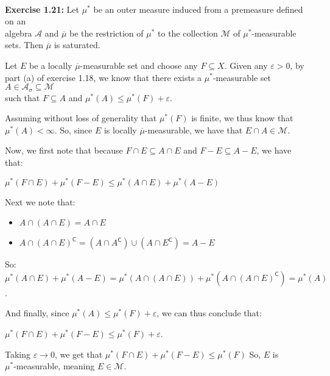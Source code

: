 \documentclass{book}
\newcommand{\exTwoP}{%
   \color{RedViolet}%
   \fontsize{13}{15}\selectfont%
}
\newenvironment{myIndent}{%
   \begin{adjustwidth}{2.5em}{0em}%
}{%
   \end{adjustwidth}%
}
\newcommand{\blab}[1]{\textbf{#1}}
\newcommand{\comp}{\mathsf{C}}
\newcommand{\mySepTwo}[1][.]{%
   {\noindent\color{#1}{\rule{6.5in}{0.5mm}}}\\%
}
\newcommand{\retTwo}{\hfill\bigbreak}
\begin{document}
\mySepTwo

\blab{Exercise 1.21:} Let $\mu^*$ be an outer measure induced from a premeasure defined on an\\ algebra $\mathcal{A}$ and $\overline{\mu}$ be the restriction of $\mu^*$ to the collection $\mathcal{M}$ of $\mu^*$-measurable sets. Then $\overline{\mu}$ is saturated.\\ [-9pt]


\begin{myIndent}\exTwoP
   Let $E$ be a locally $\overline{\mu}$-measurable set and choose any $F \subseteq X$. Given any $\varepsilon > 0$, by part (a) of exercise 1.18, we know that there exists a $\mu^*$-measurable set $A \in \mathcal{A}_{\sigma} \subseteq \mathcal{M}$\\ such that $F \subseteq A$ and $\mu^*(A) \leq \mu^*(F) + \varepsilon$.\retTwo

   Assuming without loss of generality that $\mu^*(F)$ is finite, we thus know that\\ $\mu^*(A) < \infty$. So, since $E$ is locally $\overline{\mu}$-measurable, we have that $E \cap A \in \mathcal{M}$.\retTwo

   Now, we first note that because $F \cap E \subseteq A \cap E$ and $F - E \subseteq A - E$, we have that:

   {\centering $\mu^*(F \cap E) + \mu^*(F - E) \leq \mu^*(A \cap E) + \mu^*(A - E) $\retTwo\par}

   Next we note that: 
   \begin{itemize}
      \item $A \cap (A \cap E) = A \cap E$
      \item $A \cap (A \cap E)^\comp = (A \cap A^\comp) \cup (A \cap E^\comp) = A - E$\retTwo
   \end{itemize}

   So: $\mu^*(A \cap E) + \mu^*(A - E) = \mu^*(A \cap (A \cap E)) + \mu^*(A \cap (A \cap E)^\comp) = \mu^*(A)$.\retTwo

   And finally, since $\mu^*(A) \leq \mu^*(F) + \varepsilon$, we can thus conclude that:
   
   {\centering$\mu^*(F \cap E) + \mu^*(F - E) \leq \mu^*(F) + \varepsilon$.\retTwo\par}

   Taking $\varepsilon \rightarrow 0$, we get that $\mu^*(F \cap E) + \mu^*(F - E) \leq \mu^*(F)$ So, $E$ is\\ $\mu^*$-measurable, meaning $E \in \mathcal{M}$.
\end{myIndent}
\end{document}
